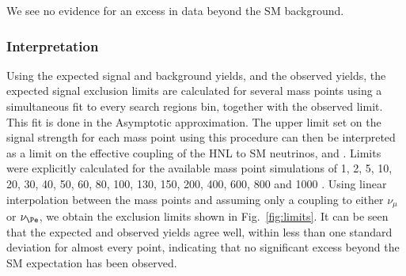We see no evidence for an excess in data beyond the SM background.

\clearpage
\subsubsection{Interpretation}
 Using the expected signal and background yields, and the observed
 yields, the expected signal exclusion limits are calculated for
 several mass points using a simultaneous fit to every search regions
 bin, together with the observed limit. This fit is done in the
 Asymptotic approximation. The upper limit set on the signal strength
 for each mass point using this procedure can then be interpreted as a
 limit on the effective coupling of the HNL to SM neutrinos, \mixpare
 and \mixparm. Limits were explicitly calculated for the available
 mass point simulations of 1, 2, 5, 10, 20, 30, 40, 50, 60, 80, 100,
 130, 150, 200, 400, 600, 800 and 1000 \GeV. Using linear
 interpolation between the mass points and assuming only a coupling to either $\nu_{\mu}$ or $\nu_{\Pe}$,
 we obtain the exclusion limits shown in Fig.~\ref{fig:limits}. It can be seen that the expected and
 observed yields agree well, within less than one standard deviation
 for almost every point, indicating that no significant excess beyond
 the SM expectation has been observed. 
